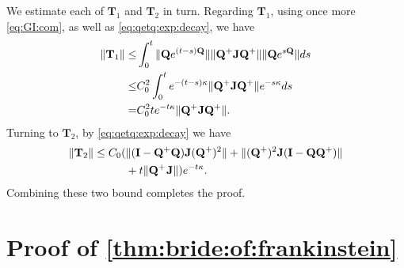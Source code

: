 \documentclass[9pt,twocolumn,twoside]{pnas-new}
\newcommand{\?}{\textbf{?}}
\newcommand{\QQ}{\mathbf{Q}}
\newcommand{\JJ}{\mathbf{J}}
\newcommand{\II}{\mathbf{I}}
\newcommand{\TT}{\mathbf{T}}
\begin{document}
We estimate each of $\TT_1$ and $\TT_2$ in turn.  Regarding $\TT_1$,
using once more \eqref{eq:GI:com}, as well as \eqref{eq:qetq:exp:decay}, we have
\begin{align*}
  \| \TT_1\| \leq&
    \int_0^t \|\QQ e^{(t-s)\QQ}\| \| \QQ^+  \JJ \QQ^{+} \|\| \QQ e^{s\QQ}\|ds
         \notag\\
   \leq& C_0^2\int_0^t  e^{-(t-s)\kappa} \| \QQ^+  \JJ \QQ^{+} \| e^{-s\kappa } ds
                         \notag\\
   =& C_0^2 t e^{-t\kappa} \| \QQ^+  \JJ  \QQ^{+} \|.
\end{align*}
Turning to $\TT_2$, by \eqref{eq:qetq:exp:decay} we have
\begin{align*}
  \| \TT_2\|
  \leq C_0 (&\| (\II -\QQ^+ \QQ) \JJ (\QQ^{+})^2\|
               + \|(\QQ^+)^2\JJ (\II - \QQ \QQ^{+})\|
               \notag\\
               &+ t\|\QQ^+ \hspace{0.25mm}\JJ\|) e^{- t \kappa }.
\end{align*}
Combining these two bound completes the proof.

\section{Proof of \cref{thm:bride:of:frankinstein}}
\end{document}
